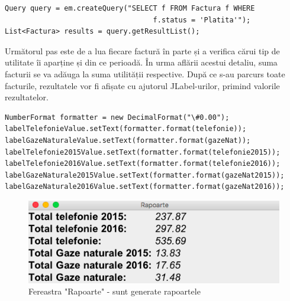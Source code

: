 \documentclass[12pt]{book}
\begin{document}
\begin{lstlisting}[frame=single, caption=Extragerea facturilor plătite]
Query query = em.createQuery("SELECT f FROM Factura f WHERE 
                                   f.status = 'Platita'");
List<Factura> results = query.getResultList();
\end{lstlisting}

Următorul pas este de a lua fiecare factură în parte și a verifica cărui tip de utilitate îi aparține și din ce perioadă. În urma aflării acestui detaliu, suma facturii se va adăuga la suma utilității respective. După ce s-au parcurs toate facturile, rezultatele vor fi afișate cu ajutorul JLabel-urilor, primind valorile rezultatelor.
\begin{lstlisting}[frame=single, caption=Setare valori JLabel]
NumberFormat formatter = new DecimalFormat("\#0.00"); 
labelTelefonieValue.setText(formatter.format(telefonie));
labelGazeNaturaleValue.setText(formatter.format(gazeNat));
labelTelefonie2015Value.setText(formatter.format(telefonie2015));
labelTelefonie2016Value.setText(formatter.format(telefonie2016));
labelGazeNaturale2015Value.setText(formatter.format(gazeNat2015));
labelGazeNaturale2016Value.setText(formatter.format(gazeNat2016));
\end{lstlisting}

\begin{figure}[!ht]
	\centering
	\includegraphics{FereastraRapoarte}
	\caption{Fereastra "Rapoarte" - sunt generate rapoartele}
\end{figure}
\end{document}
